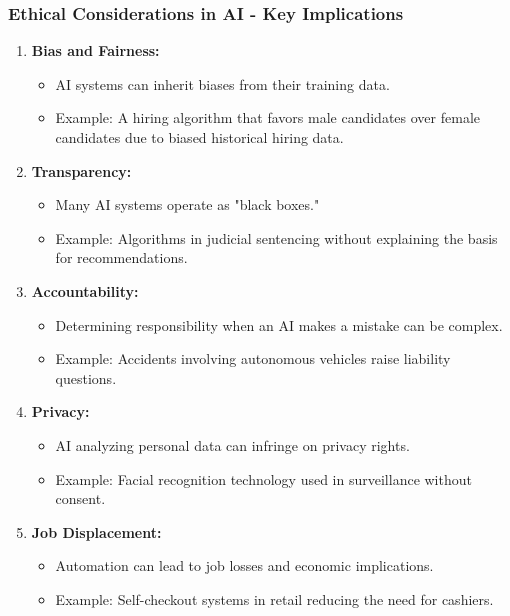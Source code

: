 \documentclass[aspectratio=169]{beamer}
\begin{document}
\begin{frame}[fragile]
    \frametitle{Ethical Considerations in AI - Key Implications}
    \begin{enumerate}
        \item \textbf{Bias and Fairness:}
            \begin{itemize}
                \item AI systems can inherit biases from their training data.
                \item Example: A hiring algorithm that favors male candidates over female candidates due to biased historical hiring data.
            \end{itemize}
        
        \item \textbf{Transparency:}
            \begin{itemize}
                \item Many AI systems operate as "black boxes."
                \item Example: Algorithms in judicial sentencing without explaining the basis for recommendations.
            \end{itemize}

        \item \textbf{Accountability:}
            \begin{itemize}
                \item Determining responsibility when an AI makes a mistake can be complex.
                \item Example: Accidents involving autonomous vehicles raise liability questions.
            \end{itemize}

        \item \textbf{Privacy:}
            \begin{itemize}
                \item AI analyzing personal data can infringe on privacy rights.
                \item Example: Facial recognition technology used in surveillance without consent.
            \end{itemize}

        \item \textbf{Job Displacement:}
            \begin{itemize}
                \item Automation can lead to job losses and economic implications.
                \item Example: Self-checkout systems in retail reducing the need for cashiers.
            \end{itemize}
    \end{enumerate}
\end{frame}
\end{document}
